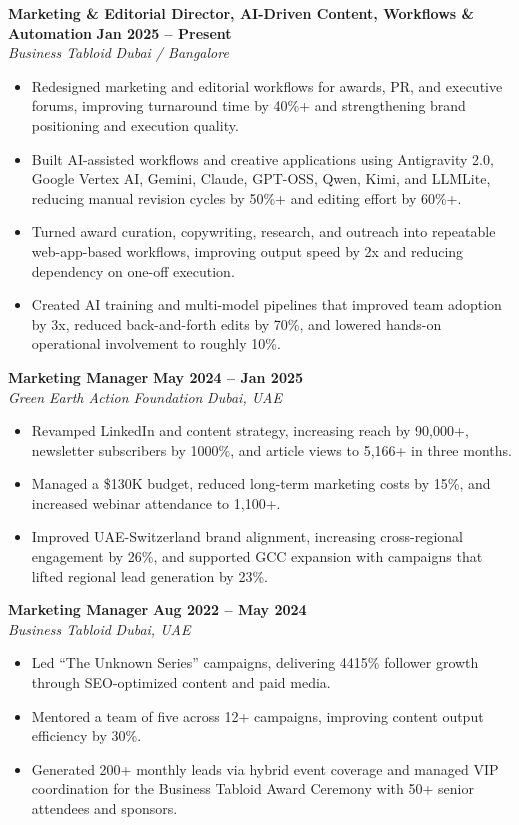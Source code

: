 \documentclass[10.5pt,a4paper]{article}
\begin{document}
\noindent\textbf{Marketing \& Editorial Director, AI-Driven Content, Workflows \& Automation} \hfill \textbf{Jan 2025 -- Present}\\
\textit{Business Tabloid} \hfill \textit{Dubai / Bangalore}
\begin{itemize}[leftmargin=*,nosep,topsep=2pt]
  \item Redesigned marketing and editorial workflows for awards, PR, and executive forums, improving turnaround time by 40\%+ and strengthening brand positioning and execution quality.
  \item Built AI-assisted workflows and creative applications using Antigravity 2.0, Google Vertex AI, Gemini, Claude, GPT-OSS, Qwen, Kimi, and LLMLite, reducing manual revision cycles by 50\%+ and editing effort by 60\%+.
  \item Turned award curation, copywriting, research, and outreach into repeatable web-app-based workflows, improving output speed by 2x and reducing dependency on one-off execution.
  \item Created AI training and multi-model pipelines that improved team adoption by 3x, reduced back-and-forth edits by 70\%, and lowered hands-on operational involvement to roughly 10\%.
\end{itemize}
\vspace{4pt}

\noindent\textbf{Marketing Manager} \hfill \textbf{May 2024 -- Jan 2025}\\
\textit{Green Earth Action Foundation} \hfill \textit{Dubai, UAE}
\begin{itemize}[leftmargin=*,nosep,topsep=2pt]
  \item Revamped LinkedIn and content strategy, increasing reach by 90,000+, newsletter subscribers by 1000\%, and article views to 5,166+ in three months.
  \item Managed a \$130K budget, reduced long-term marketing costs by 15\%, and increased webinar attendance to 1,100+.
  \item Improved UAE-Switzerland brand alignment, increasing cross-regional engagement by 26\%, and supported GCC expansion with campaigns that lifted regional lead generation by 23\%.
\end{itemize}
\vspace{4pt}

\noindent\textbf{Marketing Manager} \hfill \textbf{Aug 2022 -- May 2024}\\
\textit{Business Tabloid} \hfill \textit{Dubai, UAE}
\begin{itemize}[leftmargin=*,nosep,topsep=2pt]
  \item Led ``The Unknown Series'' campaigns, delivering 4415\% follower growth through SEO-optimized content and paid media.
  \item Mentored a team of five across 12+ campaigns, improving content output efficiency by 30\%.
  \item Generated 200+ monthly leads via hybrid event coverage and managed VIP coordination for the Business Tabloid Award Ceremony with 50+ senior attendees and sponsors.
\end{itemize}
\vspace{4pt}
\end{document}
